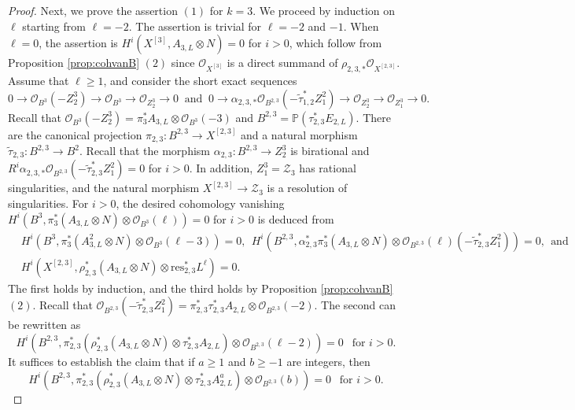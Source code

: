 \documentclass{amsart}
\theoremstyle{plain}
\theoremstyle{definition}
\theoremstyle{remark}
\newcommand{\res}{\textrm{res}}
\begin{document}
\begin{proof}
\noindent Next, we prove the assertion $(1)$ for $k=3$. We proceed by induction on $\ell$ starting from $\ell=-2$. The assertion is trivial for $\ell=-2$ and $-1$. When $\ell=0$, the assertion is $H^i(X^{[3]}, A_{3,L} \otimes N)=0$ for $i>0$, which follow from Proposition \ref{prop:cohvanB} $(2)$ since $\mathcal{O}_{X^{[3]}}$ is a direct summand of $\rho_{2,3,*} \mathcal{O}_{X^{[2,3]}}$. Assume that $\ell \geq 1$, and consider the short exact sequences
$$
0 \longrightarrow \mathcal{O}_{B^3}(-Z_2^3) \longrightarrow \mathcal{O}_{B^3} \longrightarrow \mathcal{O}_{Z_2^3} \longrightarrow 0~\text{ and }~
0 \longrightarrow \alpha_{2,3,*} \mathcal{O}_{B^{2,3}}(-\widetilde{\tau}_{1,2}^* Z_1^2) \longrightarrow \mathcal{O}_{Z_2^3} \longrightarrow \mathcal{O}_{Z_1^3} \longrightarrow 0.
$$
Recall that $\mathcal{O}_{B^3}(-Z_2^3) = \pi_3^* A_{3,L} \otimes \mathcal{O}_{B^3}(-3)$ and $B^{2,3}=\mathbb{P}(\tau_{2,3}^* E_{2,L})$. There are the canonical projection $\pi_{2,3} \colon B^{2,3} \to X^{[2,3]}$ and a natural morphism $\widetilde{\tau}_{2,3} \colon B^{2,3} \to B^2$. Recall that the morphism $\alpha_{2,3} \colon B^{2,3} \to Z_2^3$ is birational and $R^i \alpha_{2,3,*} \mathcal{O}_{B^{2,3}}(-\widetilde{\tau}_{2,3}^* Z_1^2) = 0$ for $i>0$. In addition, $Z_1^3 = \mathcal{Z}_3$ has rational singularities, and the natural morphism $X^{[2,3]} \to \mathcal{Z}_3$ is a resolution of singularities. For $i>0$, the desired cohomology vanishing $H^i(B^3,  \pi_3^* (A_{3,L} \otimes N) \otimes \mathcal{O}_{B^3}(\ell))=0$ for $i>0$ is deduced from 
\begin{align*}
& H^i(B^3,  \pi_3^* (A_{3,L}^2 \otimes N) \otimes \mathcal{O}_{B^3}(\ell-3))=0,~~ H^i(B^{2,3}, \alpha_{2,3}^* \pi_3^* (A_{3,L} \otimes N) \otimes \mathcal{O}_{B^{2,3}}(\ell)(-\widetilde{\tau}_{2,3}^* Z_1^2)) = 0,~~\text{and}\\
& H^i(X^{[2,3]}, \rho_{2,3}^* (A_{3,L} \otimes N) \otimes \res_{2,3}^*L^{\ell})=0.
\end{align*}
The first holds by induction, and the third holds by Proposition \ref{prop:cohvanB} $(2)$. Recall that $\mathcal{O}_{B^{2,3}}(-\widetilde{\tau}_{2,3}^* Z_1^2) = \pi_{2,3}^* \tau_{2,3}^* A_{2,L} \otimes \mathcal{O}_{B^{2,3}}(-2)$. The second can be rewritten as 
$$
H^i(B^{2,3}, \pi_{2,3}^* (\rho_{2,3}^*(A_{3,L} \otimes N) \otimes \tau_{2,3}^* A_{2,L}) \otimes \mathcal{O}_{B^{2,3}}(\ell-2))=0~~\text{ for $i>0$}.
$$
It suffices to establish the claim that if $a \geq 1$ and $b \geq -1$ are integers, then
$$
H^i(B^{2,3}, \pi_{2,3}^* (\rho_{2,3}^*(A_{3,L} \otimes N) \otimes \tau_{2,3}^* A_{2,L}^a) \otimes \mathcal{O}_{B^{2,3}}(b))=0~~\text{ for $i>0$}.
$$
\end{proof}
\end{document}

